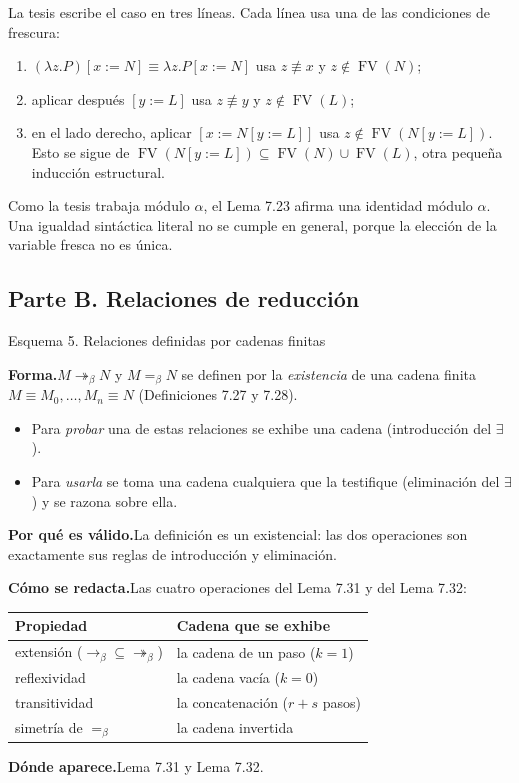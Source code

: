 \documentclass[11pt,a4paper]{article}
\newcommand{\forma}{\par\noindent\textbf{Forma.}\enspace}
\newcommand{\porque}{\par\smallskip\noindent\textbf{Por qué es válido.}\enspace}
\newcommand{\plantilla}{\par\smallskip\noindent\textbf{Cómo se redacta.}\enspace}
\newcommand{\donde}{\par\smallskip\noindent\textbf{Dónde aparece.}\enspace}
\newcommand{\FV}{\operatorname{FV}}
\newcommand{\bred}{\rightarrow_\beta}
\newcommand{\bmred}{\twoheadrightarrow_\beta}
\newcommand{\beq}{=_\beta}
\begin{document}
\begin{trampa}
La tesis escribe el caso en tres líneas. Cada línea usa una de las condiciones
de frescura:
\begin{enumerate}
  \item \((\lambda z.P)[x:=N]\equiv\lambda z.P[x:=N]\) usa \(z\not\equiv x\) y
    \(z\notin\FV(N)\);
  \item aplicar después \([y:=L]\) usa \(z\not\equiv y\) y \(z\notin\FV(L)\);
  \item en el lado derecho, aplicar \([x:=N[y:=L]]\) usa
    \(z\notin\FV(N[y:=L])\). Esto se sigue de
    \(\FV(N[y:=L])\subseteq\FV(N)\cup\FV(L)\), otra pequeña inducción
    estructural.
\end{enumerate}
Como la tesis trabaja módulo \(\alpha\), el Lema 7.23 afirma una identidad
módulo \(\alpha\). Una igualdad sintáctica literal no se cumple en general,
porque la elección de la variable fresca no es única.
\end{trampa}

\subsection*{Parte B. Relaciones de reducción}

\begin{esquema}{Esquema 5. Relaciones definidas por cadenas finitas}
\forma \(M\bmred N\) y \(M\beq N\) se definen por la \emph{existencia} de una
cadena finita \(M\equiv M_0,\dots,M_n\equiv N\) (Definiciones 7.27 y 7.28).
\begin{itemize}
  \item Para \emph{probar} una de estas relaciones se exhibe una cadena
    (introducción del \(\exists\)).
  \item Para \emph{usarla} se toma una cadena cualquiera que la testifique
    (eliminación del \(\exists\)) y se razona sobre ella.
\end{itemize}

\porque La definición es un existencial: las dos operaciones son exactamente
sus reglas de introducción y eliminación.

\plantilla Las cuatro operaciones del Lema 7.31 y del Lema 7.32:
\begin{center}
\begin{tabular}{@{}ll@{}}
\toprule
\textbf{Propiedad} & \textbf{Cadena que se exhibe}\\
\midrule
extensión (\(\bred\subseteq\bmred\)) & la cadena de un paso (\(k=1\))\\
reflexividad & la cadena vacía (\(k=0\))\\
transitividad & la concatenación (\(r+s\) pasos)\\
simetría de \(\beq\) & la cadena invertida\\
\bottomrule
\end{tabular}
\end{center}

\donde Lema 7.31 y Lema 7.32.
\end{esquema}
\end{document}
